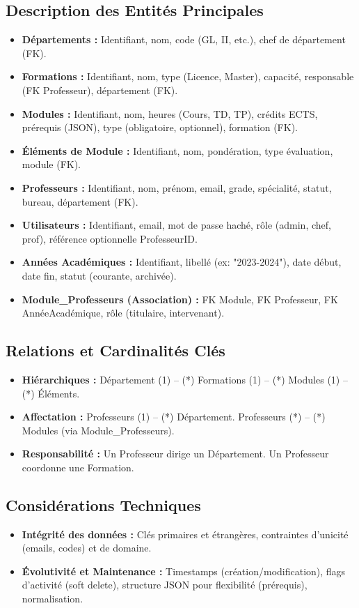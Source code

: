 \subsection{Description des Entités Principales}
\begin{itemize}
    \item \textbf{Départements :} Identifiant, nom, code (GL, II, etc.), chef de département (FK).
    \item \textbf{Formations :} Identifiant, nom, type (Licence, Master), capacité, responsable (FK Professeur), département (FK).
    \item \textbf{Modules :} Identifiant, nom, heures (Cours, TD, TP), crédits ECTS, prérequis (JSON), type (obligatoire, optionnel), formation (FK).
    \item \textbf{Éléments de Module :} Identifiant, nom, pondération, type évaluation, module (FK).
    \item \textbf{Professeurs :} Identifiant, nom, prénom, email, grade, spécialité, statut, bureau, département (FK).
    \item \textbf{Utilisateurs :} Identifiant, email, mot de passe haché, rôle (admin, chef, prof), référence optionnelle ProfesseurID.
    \item \textbf{Années Académiques :} Identifiant, libellé (ex: "2023-2024"), date début, date fin, statut (courante, archivée).
    \item \textbf{Module\_Professeurs (Association) :} FK Module, FK Professeur, FK AnnéeAcadémique, rôle (titulaire, intervenant).
\end{itemize}

\subsection{Relations et Cardinalités Clés}
\begin{itemize}
    \item \textbf{Hiérarchiques :} Département (1) -- (*) Formations (1) -- (*) Modules (1) -- (*) Éléments.
    \item \textbf{Affectation :} Professeurs (1) -- (*) Département. Professeurs (*) -- (*) Modules (via Module\_Professeurs).
    \item \textbf{Responsabilité :} Un Professeur dirige un Département. Un Professeur coordonne une Formation.
\end{itemize}

\subsection{Considérations Techniques}
\begin{itemize}
    \item \textbf{Intégrité des données :} Clés primaires et étrangères, contraintes d'unicité (emails, codes) et de domaine.
    \item \textbf{Évolutivité et Maintenance :} Timestamps (création/modification), flags d'activité (soft delete), structure JSON pour flexibilité (prérequis), normalisation.
\end{itemize}

